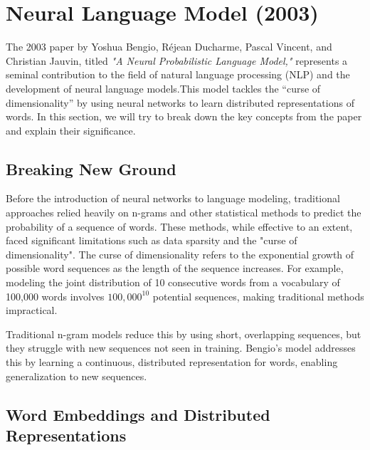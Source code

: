
% 



\section{Neural Language Model (2003)}

The 2003 paper by Yoshua Bengio, Réjean Ducharme, Pascal Vincent, and Christian Jauvin, titled \textit{"A Neural Probabilistic Language Model,"} represents a seminal contribution to the field of natural language processing (NLP) and the development of neural language models.This model tackles the “curse of dimensionality” by using neural networks to learn distributed representations of words. In this section, we will try to break down the key concepts from the paper and explain their significance.

\subsection{Breaking New Ground}

Before the introduction of neural networks to language modeling, traditional approaches relied heavily on n-grams and other statistical methods to predict the probability of a sequence of words. These methods, while effective to an extent, faced significant limitations such as data sparsity and the "curse of dimensionality". The curse of dimensionality refers to the exponential growth of possible word sequences as the length of the sequence increases. For example, modeling the joint distribution of 10 consecutive words from a vocabulary of 100,000 words involves $100,000^{10}$ potential sequences, making traditional methods impractical.

Traditional n-gram models reduce this by using short, overlapping sequences, but they struggle with new sequences not seen in training. Bengio’s model addresses this by learning a continuous, distributed representation for words, enabling generalization to new sequences.
\subsection{Word Embeddings and Distributed Representations}

